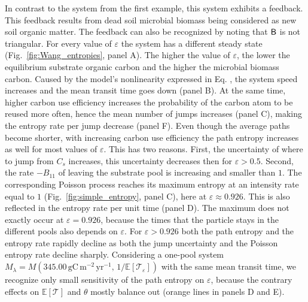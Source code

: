 \documentclass[smallextended]{svjour3}
\makeatletter
\renewcommand*{\eqref}[1]{%
  \hyperref[{#1}]{\textup{\tagform@{\ref*{#1}}}}%
}
\newcommand{\E}{\mathbb{E}}
\newcommand{\TT}{\mathcal{T}}
\newcommand{\gC}{\mathrm{gC}}
\newcommand{\yr}{\mathrm{yr}}
\newcommand{\meter}{\mathrm{m}}
\makeatother
\begin{document}
In contrast to the system from the first example, this system exhibits a feedback.
This feedback results from dead soil microbial biomass being considered as new soil organic matter.
The feedback can also be recognized by noting that $\mathsf{B}$ is not triangular.
For every value of $\varepsilon$ the system has a different steady state (Fig.~\ref{fig:Wang_entropies}, panel A).
The higher the value of $\varepsilon$, the lower the equilibrium substrate organic carbon and the higher the microbial biomass carbon.
Caused by the model's nonlinearity expressed in Eq. \eqref{eqn:lambdax}, the system speed increases and the mean transit time goes down (panel B).
At the same time, higher carbon use efficiency increases the probability of the carbon atom to be reused more often, hence the mean number of jumps increases (panel C), making the entropy rate per jump decrease (panel F).
Even though the average paths become shorter, with increasing carbon use efficiency the path entropy increases as well for most values of $\varepsilon$.
This has two reasons.
First, the uncertainty of where to jump from $C_s$ increases, this uncertainty decreases then for $\varepsilon>0.5$.
Second, the rate $-B_{11}$ of leaving the substrate pool is increasing and smaller than $1$.
The corresponding Poisson process reaches its maximum entropy at an intensity rate equal to $1$ (Fig.~\ref{fig:simple_entropy}, panel C), here at $\varepsilon\approx0.926$.
This is also reflected in the entropy rate per unit time (panel D).
The maximum does not exactly occur at $\varepsilon=0.926$, because the times that the particle stays in the different pools also depends on $\varepsilon$.
For $\varepsilon>0.926$ both the path entropy and the entropy rate rapidly decline as both the jump uncertainty and the Poisson entropy rate decline sharply.
Considering a one-pool system $M_\lambda=M(345.00\,\gC\,\meter^{-2}\,\yr^{-1},\, 1/\E\left[\TT_\varepsilon\right])$ with the same mean transit time, we recognize only small sensitivity of the path entropy on $\varepsilon$, because the contrary effects on $\E\left[\TT\right]$ and $\theta$ mostly balance out (orange lines in panels D and E).
\end{document}

